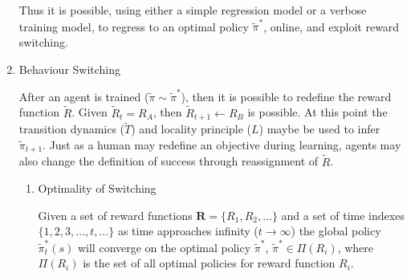 \begin{enumerate}[label=1.0.\arabic*]
Thus it is possible, using either a simple regression model or a verbose training model, to regress to an optimal policy $\tilde{\pi}^\ast$, online, and exploit reward switching.\\

\item Behaviour Switching

After an agent is trained ($\tilde{\pi}\sim\tilde{\pi}^\ast$), then it is possible to redefine the reward function $\tilde{R}$. Given $\tilde{R}_{t} = R_{A}$, then $\tilde{R}_{t+1} \leftarrow R_{B}$ is possible. At this point the transition dynamics ($\tilde{T}$) and locality principle ($L$) maybe be used to infer $\tilde{\pi}_{t+1}$. Just as a human may redefine an objective during learning, agents may also change the definition of success through reassignment of $\tilde{R}$.\\
\begin{enumerate}[label=1.0.\arabic{enumi}.\arabic*]
\item Optimality of Switching

Given a set of reward functions $\mathbf{R}=\{R_1, R_2, \ldots \}$ and a set of time indexes $\{ 1, 2, 3, \ldots, t, \ldots \}$ as time approaches infinity ($t \to \infty$) the global policy $\tilde{\pi}^\ast_{t}(s)$ will converge on the optimal policy $\tilde{\pi}^\ast$, $\tilde{\pi}^\ast \in \Pi(R_i)$, where $\Pi(R_i)$ is the set of all optimal policies for reward function $R_i$.
\end{enumerate}


\end{enumerate}
